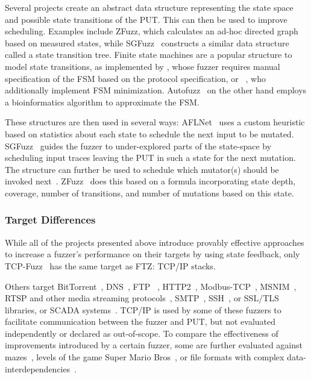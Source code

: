 \documentclass[twocolumn]{article}
\newcommand{\proj}{FTZ\xspace}
\let\savedCite=\cite
\renewcommand{\cite}{\unskip~\savedCite}
\begin{document}
Several projects create an abstract data structure representing the state space and possible state transitions of the PUT. This can then be used to improve scheduling. Examples include ZFuzz, which calculates an ad-hoc directed graph based on measured states, while SGFuzz\cite{SGFuzz} constructs a similar data structure called a state transition tree. Finite state machines are a popular structure to model state transitions, as implemented by \citeauthor{Congestion}, whose fuzzer requires manual specification of the FSM based on the protocol specification, or \citeauthor{ModelBased}\cite{ModelBased}, who additionally implement FSM minimization. Autofuzz\cite{Autofuzz} on the other hand employs a bioinformatics algorithm to approximate the FSM.

These structures are then used in several ways: AFLNet\cite{AFLNET} uses a custom heuristic based on statistics about each state to schedule the next input to be mutated. SGFuzz\cite{SGFuzz} guides the fuzzer to under-explored parts of the state-space by scheduling input traces leaving the PUT in such a state for the next mutation. The structure can further be used to schedule which mutator(s) should be invoked next\cite{ModelBased}. ZFuzz\cite{ZFuzz} does this based on a formula incorporating state depth, coverage, number of transitions, and number of mutations based on this state.

\subsubsection{Target Differences}

While all of the projects presented above introduce provably effective approaches to increase a fuzzer's performance on their targets by using state feedback, only TCP-Fuzz\cite{TCPFuzz} has the same target as \proj: TCP/IP stacks.

Others target BitTorrent\cite{Ankou}, DNS\cite{StateAFL}, FTP \cite{AFLNET, FitM, StateAFL, Autofuzz,ZFuzz}, HTTP2\cite{SGFuzz}, Modbus-TCP\cite{ModbusTCP,ModbusTCP2, GANFuzz, MTA, MTFStorm, AnotherModbusTCP}, MSNIM\cite{ModelBased}, RTSP and other media streaming protocols\cite{AFLNET, SGFuzz}, SMTP\cite{StateAFL}, SSH\cite{StateAFL}, or SSL/TLS\cite{SGFuzz,ZFuzz,DDFuzz} libraries, or SCADA systems\cite{EPF}. TCP/IP is used by some of these fuzzers to facilitate communication between the fuzzer and PUT, but not evaluated independently or declared as out-of-scope. To compare the effectiveness of improvements introduced by a certain fuzzer, some are further evaluated against mazes\cite{Ijon, SandPuppy}, levels of the game Super Mario Bros\cite{Ijon, SandPuppy}, or file formats with complex data-interdependencies\cite{Ijon, SandPuppy, DDFuzz, Ankou}.
\end{document}
